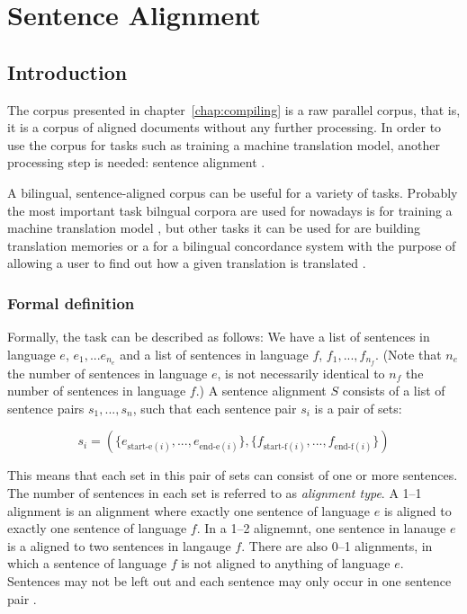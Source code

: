 \chapter{Sentence Alignment}
\section{Introduction}

The corpus presented in chapter~\ref{chap:compiling} is a raw parallel corpus, that is, it is a corpus of aligned documents without any further processing. 
In order to use the corpus for tasks such as training a machine translation model, another processing step is needed: sentence alignment \autocite[55]{koehn2009}.

A bilingual, sentence-aligned corpus can be useful for a variety of tasks. 
Probably the most important task bilngual corpora are used for nowadays is for training a machine translation model \autocites{gale-church-1991-program,moore2002fast,chen-1993-aligning}, but other tasks it can be used for are building translation memories \autocite{sennrich-volk-2011-iterative} or a for a bilingual concordance system with the purpose of allowing a user to find out how a given translation is translated \autocites{moore2002fast,gale-church-1991-program}.

\subsection{Formal definition}
Formally, the task can be described as follows: We have a list of sentences in language \(e\), \(e_1,...e_{n_e}\) and a list of sentences in language \(f\), \(f_1,...,f_{n_f}\). 
(Note that \(n_e\) the number of sentences in language $e$, is not necessarily identical to \(n_f\) the number of sentences in language \(f\).) 
A sentence alignment \(S\) consists of a list of sentence pairs \(s_1, ..., s_n\), such that each sentence pair \(s_i\) is a pair of sets:

\[
	s_i = ( \{ e_{\text{start-e}(i)},... , e_{\text{end-e}(i)}\}, \{f_{\text{start-f}(i)},... , f_{\text{end-f}(i)}\} )
\]
\autocite[56]{koehn2009}

This means that each set in this pair of sets can consist of one or more sentences. 
The number of sentences in each set is referred to as \emph{alignment type}. 
A 1--1 alignment is an alignment where exactly one sentence of language \(e\)
is aligned to exactly one sentence of language \(f\). 
In a 1--2 alignemnt, one sentence in lanauge \(e\) is a aligned to two sentences in langauge \(f\). 
There are also 0--1 alignments, in which a sentence of language \(f\) is not aligned to anything of language \(e\). 
Sentences may not be left out and each sentence may only occur in one sentence pair \autocite[57]{koehn2009}. 



